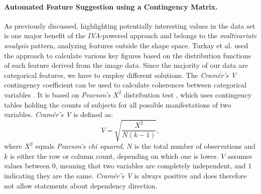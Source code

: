 \documentclass[journal]{style/vgtc} 			          %
\begin{document}
\paragraph{Automated Feature Suggestion using a Contingency Matrix.}
As previously discussed, highlighting potentially interesting values in the data set is one major benefit of the \emph{IVA}-powered approach and belongs to the \emph{multivariate analysis} pattern,  analyzing features outside the shape space.
%
Turkay et al. \cite{Turkay2013} used the approach to calculate various key figures based on the distribution functions of each feature derived from the image data.
%
Since the majority of our data are categorical features, we have to employ different solutions.
%
The \emph{Cram\'{e}r's V} contingency coefficient can be used to calculate coherences between categorical variables \cite{CramerV}.
%
It is based on \emph{Pearson's $X^2$} distribution test \cite{ChiSquare}, which uses contingency tables holding the counts of subjects for all possible manifestations of two variables.
%
\emph{Cram\'{e}r's V} is defined as:
\begin{equation}
V = \sqrt{\frac{X^2}{N(k-1)}},
\end{equation}
where $X^2$ equals \emph{Pearson's chi squared}, $N$ is the total number of observations and $k$ is either the row or column count, depending on which one is lower.
%
$V$ assumes values between $0$, meaning that two variables are completely independent, and $1$ indicating they are the same.
%
\emph{Cram\'{e}r's V} is always positive and does therefore not allow statements about dependency direction.
\end{document}
